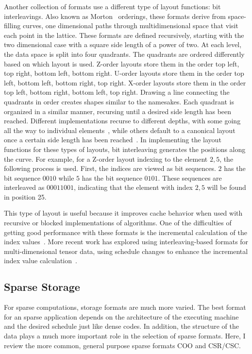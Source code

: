 Another collection of formats use a different type of layout functions: bit interleavings.
Also known as Morton~\cite{morton} orderings, these formats derive from space-filling curves, one dimensional paths through multidimensional space that visit each point in the lattice.
These formats are defined recursively, starting with the two dimensional case with a square side length of a power of two.
At each level, the data space is split into four quadrants.
The quadrants are ordered differently based on which layout is used. 
Z-order layouts store them in the order top left, top right, bottom left, bottom right.
U-order layouts store them in the order top left, bottom left, bottom right, top right.
X-order layouts store them in the order top left, bottom right, bottom left, top right.
Drawing a line connecting the quadrants in order creates shapes similar to the namesakes.
Each quadrant is organized in a similar manner, recursing until a desired side length has been reached. 
Different implementations recurse to different depths, with some going all the way to individual elements~\cite{frens1997auto}, while others default to a canonical layout once a certain side length has been reached~\cite{chatterjee1999recursive}.
In implementing the layout functions for these types of layouts, bit interleaving generates the positions along the curve.
For example, for a Z-order layout indexing to the element $2,5$, the following process is used.
First, the indices are viewed as bit sequences. $2$ has the bit sequence $0010$ while $5$ has the bit sequence $0101$.
These sequences are interleaved as $00011001$, indicating that the element with index $2,5$ will be found in position 25.

This type of layout is useful because it improves cache behavior when used with recursive or blocked implementations of algorithms.
One of the difficulties of getting good performance with these formats is the incremental calculation of the index values~\cite{wise2000ahnentafel,adams2006fast}.
More recent work has explored using interleaving-based formats for multi-dimensional tensor data, using schedule changes to enhance the incremental index value calculation~\cite{pawlowski2019multi}.

\subsection{Sparse Storage}

For sparse computations, storage formats are much more varied.
The best format for an sparse application depends on the architecture of the executing machine and the desired schedule just like dense codes.
In addition, the structure of the data plays a much more important role in the selection of sparse formats.
Here, I review the more common, general purpose sparse formats COO and CSR/CSC.

